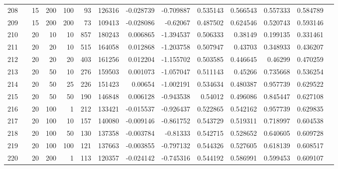\begin{longtable}{llrrrrrrrrrrrr}
		208 & &           15 &               200 &          100 &          93 &     126316 & -0.028739 & -0.709887 &  0.535143 &    0.566543 &       0.557333 &  0.584789 \\
		209 & &           15 &               200 &          200 &          73 &     109413 & -0.028086 &  -0.62067 &  0.487502 &    0.624546 &       0.520743 &  0.593146 \\
		210 & &           20 &                10 &           10 &         857 &     180243 &  0.006865 & -1.394537 &  0.506333 &     0.38149 &       0.199135 &  0.331461 \\
		211 & &           20 &                20 &           10 &         515 &     164058 &  0.012868 & -1.203758 &  0.507947 &     0.43703 &       0.348933 &  0.436207 \\
		212 & &           20 &                20 &           20 &         403 &     161256 &  0.012204 & -1.155702 &  0.503585 &    0.446645 &        0.46299 &  0.470259 \\
		213 & &           20 &                50 &           10 &         276 &     159503 &  0.001073 & -1.057047 &  0.511143 &     0.45266 &       0.735668 &  0.536254 \\
		214 & &           20 &                50 &           25 &         226 &     151423 &   0.00654 & -1.002191 &  0.534634 &    0.480387 &       0.957739 &  0.629522 \\
		215 & &           20 &                50 &           50 &         190 &     146848 &  0.006128 & -0.943538 &   0.54012 &    0.496086 &       0.845447 &  0.627108 \\
		216 & &           20 &               100 &            1 &         212 &     133421 & -0.015537 & -0.926437 &  0.522865 &    0.542162 &       0.957739 &  0.629835 \\
		217 & &           20 &               100 &           10 &         157 &     140080 & -0.009146 & -0.861752 &  0.543729 &    0.519311 &       0.718997 &  0.604538 \\
		218 & &           20 &               100 &           50 &         130 &     137358 & -0.003784 &  -0.81333 &  0.542715 &    0.528652 &       0.640605 &  0.609728 \\
		219 & &           20 &               100 &          100 &         121 &     137663 & -0.003855 & -0.797132 &  0.544326 &    0.527605 &       0.618139 &  0.608517 \\
		220 & &           20 &               200 &            1 &         113 &     120357 & -0.024142 & -0.745316 &  0.544192 &    0.586991 &       0.599453 &  0.609107 \\

\end{longtable}
